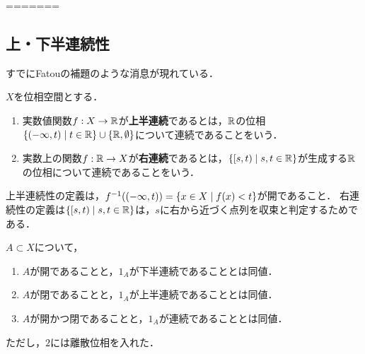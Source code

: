 \documentclass[uplatex,dvipdfmx]{jsreport}
\begin{document}
\begin{theorem}[付値が定める距離空間]
    
\end{theorem}
=======
\subsection{上・下半連続性}

\begin{tcolorbox}[colframe=ForestGreen, colback=ForestGreen!10!white,breakable,colbacktitle=ForestGreen!40!white,coltitle=black,fonttitle=\bfseries\sffamily,
title=]
    すでにFatouの補題のような消息が現れている．
\end{tcolorbox}

\begin{definition}
    $X$を位相空間とする．
    \begin{enumerate}
        \item 実数値関数$f:X\to\mathbb{R}$が\textbf{上半連続}であるとは，$\mathbb{R}$の位相$\{(-\infty,t)\mid t\in\mathbb{R}\}\cup\{\mathbb{R},\emptyset\}$について連続であることをいう．
        \item 実数上の関数$f:\mathbb{R}\to X$が\textbf{右連続}であるとは，$\left\{[s,t)\mid s,t\in\mathbb{R}\right\}$が生成する$\mathbb{R}$の位相について連続であることをいう．
    \end{enumerate}
\end{definition}
\begin{remark}
    上半連続性の定義は，$f^{-1}((-\infty,t))=\left\{x\in X\mid f(x)<t\right\}$が開であること．
    右連続性の定義は$\left\{[s,t)\mid s,t\in\mathbb{R}\right\}$は，$s$に右から近づく点列を収束と判定するためである．
\end{remark}

\begin{proposition}[特性関数の連続性]
    $A\subset X$について，
    \begin{enumerate}
        \item $A$が開であることと，$1_A$が下半連続であることとは同値．
        \item $A$が閉であることと，$1_A$が上半連続であることとは同値．
        \item $A$が開かつ閉であることと，$1_A$が連続であることとは同値．
    \end{enumerate}
    ただし，$2$には離散位相を入れた．
\end{proposition}
\end{document}
